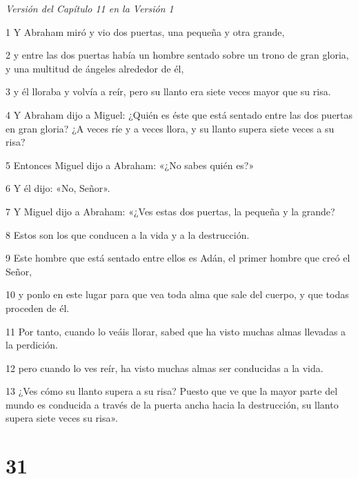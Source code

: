 \par \textit{Versión del Capítulo 11 en la Versión 1}

\par 1 Y Abraham miró y vio dos puertas, una pequeña y otra grande,

\par 2 y entre las dos puertas había un hombre sentado sobre un trono de gran gloria, y una multitud de ángeles alrededor de él,

\par 3 y él lloraba y volvía a reír, pero su llanto era siete veces mayor que su risa.

\par 4 Y Abraham dijo a Miguel: ¿Quién es éste que está sentado entre las dos puertas en gran gloria? ¿A veces ríe y a veces llora, y su llanto supera siete veces a su risa?

\par 5 Entonces Miguel dijo a Abraham: «¿No sabes quién es?»

\par 6 Y él dijo: «No, Señor».

\par 7 Y Miguel dijo a Abraham: «¿Ves estas dos puertas, la pequeña y la grande?

\par 8 Estos son los que conducen a la vida y a la destrucción.

\par 9 Este hombre que está sentado entre ellos es Adán, el primer hombre que creó el Señor,

\par 10 y ponlo en este lugar para que vea toda alma que sale del cuerpo, y que todas proceden de él.

\par 11 Por tanto, cuando lo veáis llorar, sabed que ha visto muchas almas llevadas a la perdición.

\par 12 pero cuando lo ves reír, ha visto muchas almas ser conducidas a la vida.

\par 13 ¿Ves cómo su llanto supera a su risa? Puesto que ve que la mayor parte del mundo es conducida a través de la puerta ancha hacia la destrucción, su llanto supera siete veces su risa».

\chapter{31}

